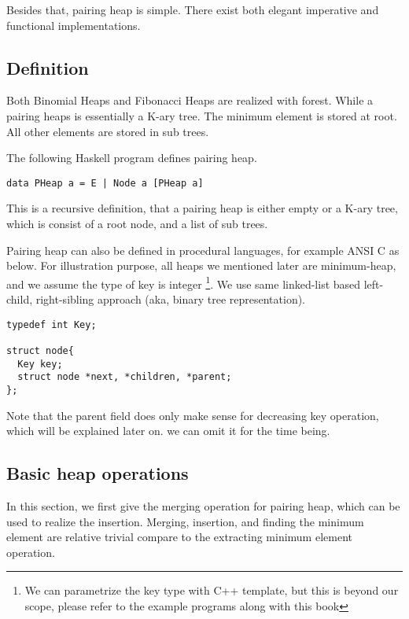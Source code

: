 \documentclass{article}
\begin{document}
Besides that, pairing heap is simple. There exist both elegant 
imperative and functional implementations. 

\subsection{Definition}

Both Binomial Heaps and Fibonacci Heaps are realized with forest. 
While a pairing heaps is essentially a K-ary tree. The minimum element
is stored at root. All other elements are stored in sub trees.

The following Haskell program defines pairing heap.

\lstset{language=Haskell}
\begin{lstlisting}
data PHeap a = E | Node a [PHeap a]
\end{lstlisting}

This is a recursive definition, that a pairing heap is either empty
or a K-ary tree, which is consist of a root node, and a list of sub trees.

Pairing heap can also be defined in procedural languages, for example
ANSI C as below. For illustration purpose, all heaps we mentioned later
are minimum-heap, and we assume the type of key is integer \footnote{We
can parametrize the key type with C++ template, but this is beyond
our scope, please refer to the example programs along with
this book}. We use same linked-list based left-child, right-sibling 
approach (aka, binary tree representation\cite{CLRS}).

\lstset{language=C}
\begin{lstlisting}
typedef int Key;

struct node{
  Key key;
  struct node *next, *children, *parent;
};
\end{lstlisting}

Note that the parent field does only make sense for decreasing key
operation, which will be explained later on. we can omit it for the
time being. 


\subsection{Basic heap operations}
In this section, we first give the merging operation for pairing
heap, which can be used to realize the insertion. Merging, insertion,
and finding the minimum element are relative trivial compare to
the extracting minimum element operation.
\end{document}

